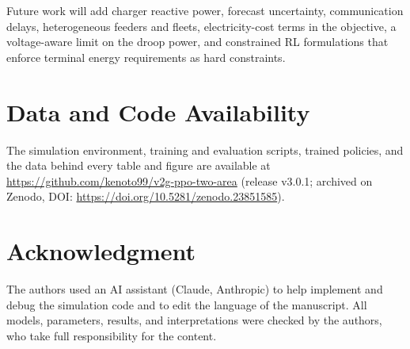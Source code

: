 Future work will add charger reactive power, forecast uncertainty,
communication delays, heterogeneous feeders and fleets, electricity-cost
terms in the objective, a voltage-aware limit on the droop power, and
constrained RL formulations that enforce terminal energy requirements
as hard constraints.

\section*{Data and Code Availability}
The simulation environment, training and evaluation scripts, trained
policies, and the data behind every table and figure are available at
\url{https://github.com/kenoto99/v2g-ppo-two-area} (release v3.0.1;
archived on Zenodo, DOI: \url{https://doi.org/10.5281/zenodo.23851585}).

\section*{Acknowledgment}
The authors used an AI assistant (Claude, Anthropic) to help implement
and debug the simulation code and to edit the language of the
manuscript. All models, parameters, results, and interpretations were
checked by the authors, who take full responsibility for the content.
